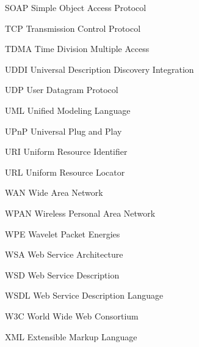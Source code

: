  {SOAP}
  {Simple Object Access Protocol}

  {TCP}
  {Transmission Control Protocol}

  {TDMA}
  {Time Division Multiple Access}

  {UDDI}
  {Universal Description Discovery Integration}

  {UDP}
  {User Datagram Protocol}

  {UML}
  {Unified Modeling Language}


  {UPnP}
  {Universal Plug and Play}

  {URI}
  {Uniform Resource Identifier}

  {URL}
  {Uniform Resource Locator}

  {WAN}
  {Wide Area Network}

  {WPAN}
  {Wireless Personal Area Network}

  {WPE}
  {Wavelet Packet Energies}

  {WSA}
  {Web Service Architecture}

  {WSD}
  {Web Service Description}

  {WSDL}
  {Web Service Description Language}

  {W3C}
  {World Wide Web Consortium}

  {XML}
  {Extensible Markup Language}
